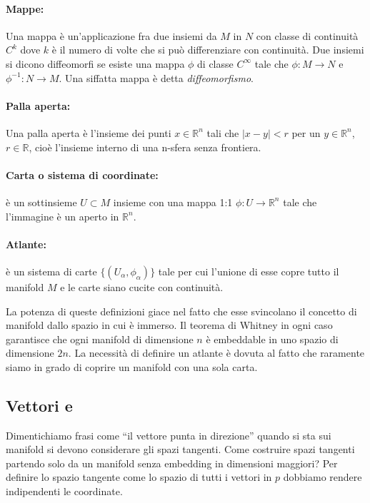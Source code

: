 \documentclass[twoside]{article}
\begin{document}
\paragraph{Mappe:} Una mappa è un'applicazione fra due insiemi da $M$ in $N$ con classe di continuità $C^k$ dove $k$ è il numero di volte che si può differenziare con continuità. Due insiemi si dicono diffeomorfi se esiste una mappa $\phi$ di classe $C^\infty$ tale che $\phi : M \rightarrow N$ e $\phi^{-1} : N \rightarrow M$. Una siffatta mappa è detta \emph{diffeomorfismo}.
\paragraph{Palla aperta:} Una palla aperta è l'insieme dei punti $x\in \mathbb{R}^n$ tali che $|x-y| < r$ per un $y \in \mathbb{R}^n$, $r\in \mathbb{R}$, cioè l'insieme interno di una n-sfera senza frontiera.
\paragraph{Carta o sistema di coordinate:} è un sottinsieme $U \subset M$ insieme con una mappa 1:1 $\phi : U \rightarrow \mathbb{R}^n$ tale che l'immagine è un aperto in $\mathbb{R}^n$.
\paragraph{Atlante:} è un sistema di carte $\{ (U_\alpha,\phi_\alpha)\}$ tale per cui l'unione di esse copre tutto il manifold $M$ e le carte siano cucite con continuità.

La potenza di queste definizioni giace nel fatto che esse svincolano il concetto di manifold dallo spazio in cui è immerso. Il teorema di Whitney in ogni caso garantisce che ogni manifold di dimensione $n$ è embeddable in uno spazio di dimensione $2n$. La necessità di definire un atlante è dovuta al fatto che raramente siamo in grado di coprire un manifold con una sola carta.

\subsection{Vettori e }
Dimentichiamo frasi come ``il vettore punta in direzione'' quando si sta sui manifold si devono considerare gli spazi tangenti. Come costruire spazi tangenti partendo solo da un manifold senza embedding in dimensioni maggiori? Per definire lo spazio tangente come lo spazio di tutti i vettori in $p$ dobbiamo rendere indipendenti le coordinate.
\end{document}

